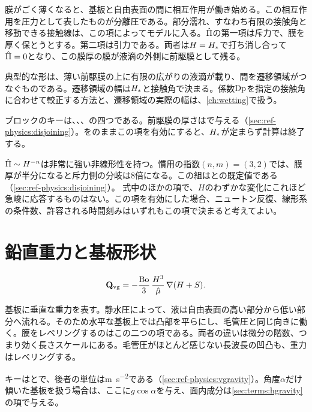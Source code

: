 膜がごく薄くなると、基板と自由表面の間に相互作用が働き始める。この相互作用を圧力として表したものが分離圧である。部分濡れ、すなわち有限の接触角と移動できる接触線は、この項によってモデルに入る。$\hat{\Pi}$の第一項は斥力で、膜を厚く保とうとする。第二項は引力である。両者は$H = H_{*}$で打ち消し合って$\hat{\Pi} = 0$となり、この膜厚の膜が液滴の外側に前駆膜として残る。

典型的な形は、薄い前駆膜の上に有限の広がりの液滴が載り、間を遷移領域がつなぐものである。遷移領域の幅は$H_{*}$と接触角で決まる。係数$\mathrm{Dp}$を指定の接触角に合わせて較正する方法と、遷移領域の実際の幅は、\cref{ch:wetting}で扱う。

ブロックのキーは、、、の四つである。前駆膜の厚さはで与える（\cref{sec:ref-physics:disjoining}）。をのままこの項を有効にすると、$H_{*}$が定まらず計算は終了する。

\begin{warn}[モデルの中で最も硬い項]
  $\hat{\Pi} \sim H^{-n}$は非常に強い非線形性を持つ。慣用の指数$(n,m) = (3,2)$では、膜厚が半分になると斥力側の分岐は8倍になる。この組はとの既定値である（\cref{sec:ref-physics:disjoining}）。
  式中のほかの項で、$H$のわずかな変化にこれほど急峻に応答するものはない。この項を有効にした場合、ニュートン反復、線形系の条件数、許容される時間刻みはいずれもこの項で決まると考えてよい。
\end{warn}

\section{鉛直重力と基板形状}
\label{sec:terms:vgravity}

\begin{equation}\label{eq:q-vg}
  \mathbf{Q}_{\mathrm{vg}} = -\frac{\mathrm{Bo}}{3}\,\frac{H^{3}}{\hat{\mu}}\,\nabla(H+S).
\end{equation}

基板に垂直な重力を表す。静水圧によって、液は自由表面の高い部分から低い部分へ流れる。そのため水平な基板上では凸部を平らにし、毛管圧と同じ向きに働く。膜をレベリングするのはこの二つの項である。両者の違いは微分の階数、つまり効く長さスケールにある。毛管圧がほとんど感じない長波長の凹凸も、重力はレベリングする。

キーはとで、後者の単位は\si{\metre\per\second\squared}である（\cref{sec:ref-physics:vgravity}）。角度$\alpha$だけ傾いた基板を扱う場合は、ここに$g\cos\alpha$を与え、面内成分は\cref{sec:terms:hgravity}の項で与える。

